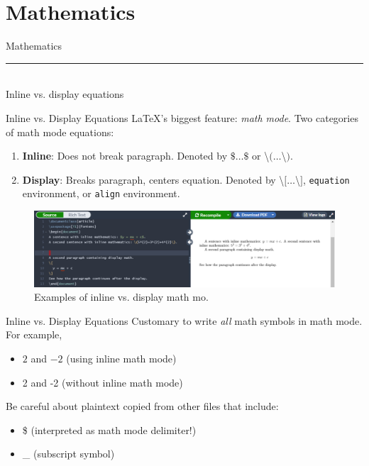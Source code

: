 \documentclass{beamer}
\begin{document}
{  \section{Mathematics}

  \begin{frame}[plain]
    \vfill
    \centering
    \begin{beamercolorbox}[sep=8pt,center,shadow=true,rounded=true]{Mathematics}
      \insertsectionhead\par%
      \color{davisblue}\noindent\rule{10cm}{1pt} \\
      \footnotesize{Inline vs. display equations}
    \end{beamercolorbox}
    \vfill
  \end{frame}

  \begin{frame}{Inline vs. Display Equations}
    \LaTeX's biggest feature: \emph{math mode}. Two categories of math mode equations:
    \begin{enumerate}
      \item \textbf{Inline}: Does not break paragraph. Denoted by $\$\dots\$$ or \textbackslash$(\dots$\textbackslash$)$.
      \item \textbf{Display}: Breaks paragraph, centers equation. Denoted by \textbackslash$[\dots$\textbackslash$]$, \texttt{equation} environment, or \texttt{align} environment.
    \end{enumerate}
    \begin{figure}
      \includegraphics[width=0.9\linewidth]{day02-01A-inline-vs-display.png}
      \caption{Examples of inline vs. display math mo.}
      \label{fig:day02-01}
    \end{figure}
  \end{frame}

  \begin{frame}{Inline vs. Display Equations}
    Customary to write \emph{all} math symbols in math mode. For example,
    \begin{itemize} 
      \item $2$ and $-2$ (using inline math mode)
      \item 2 and -2 (without inline math mode)
    \end{itemize}
    Be careful about plaintext copied from other files that include:
    \begin{itemize}
      \item \$ (interpreted as math mode delimiter!)
      \item \_ (subscript symbol)
    \end{itemize}
  \end{frame}

}
\end{document}
